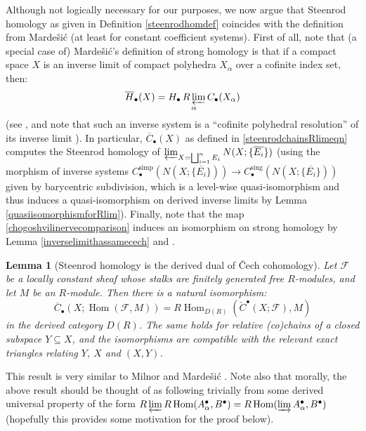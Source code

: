 \documentclass[12pt]{article}
\newtheorem{lemma}[theorem]{Lemma}
\theoremstyle{definition}
\theoremstyle{remark}
\numberwithin{equation}{subsection}
\newcommand{\F}{\mathcal F}
\newcommand{\sC}{\overline C}
\newcommand{\sH}{\overline H}
\newcommand{\cC}{\check C}
\newcommand{\Hom}{\operatorname{Hom}}
\newcommand{\Rlim}{\mathop{R\varprojlim}}
\begin{document}
Although not logically necessary for our purposes, we now argue that Steenrod homology as given in Definition \ref{steenrodhomdef} coincides with the definition from Marde\v si\'c \cite{mardesic} (at least for constant coefficient systems).  First of all, note that (a special case of) Marde\v si\'c's definition of strong homology is that if a compact space $X$ is an inverse limit of compact polyhedra $X_\alpha$ over a cofinite index set, then:
\begin{equation}
\sH_\bullet(X)=H_\bullet\Rlim_\alpha C_\bullet(X_\alpha)
\end{equation}
(see \cite[p379, \S19.1]{mardesic}, and note that such an inverse system is a ``cofinite polyhedral resolution'' of its inverse limit \cite[p103, \S6]{mardesic}).  In particular, $\sC_\bullet(X)$ as defined in \eqref{steenrodchainsRlimeqn} computes the Steenrod homology of $\varprojlim_{X=\bigsqcup_{i=1}^nE_i}N(X;\{\overline{E_i}\})$ (using the morphism of inverse systems $C_\bullet^\mathrm{simp}(N(X;\{\overline{E_i}\}))\to C_\bullet^\mathrm{sing}(N(X;\{\overline{E_i}\}))$ given by barycentric subdivision, which is a level-wise quasi-isomorphism and thus induces a quasi-isomorphism on derived inverse limits by Lemma \ref{quasiisomorphismforRlim}).  Finally, note that the map \eqref{chogoshvilinervecomparison} induces an isomorphism on strong homology by Lemma \ref{inverselimithassamecech} and \cite[p446, Theorem 21.15]{mardesic}.

\begin{lemma}[Steenrod homology is the derived dual of \v Cech cohomology]\label{steenrodisderiveddualofcech}
Let $\F$ be a locally constant sheaf whose stalks are finitely generated free $R$-modules, and let $M$ be an $R$-module.  Then there is a natural isomorphism:
\begin{equation}\label{strongcechdualiso}
\sC_\bullet(X;\Hom(\F,M))=R\Hom_{D(R)}(\cC^\bullet(X;\F),M)
\end{equation}
in the derived category $D(R)$.  The same holds for relative (co)chains of a closed subspace $Y\subseteq X$, and the isomorphisms are compatible with the relevant exact triangles relating $Y$, $X$ and $(X,Y)$.
\end{lemma}

This result is very similar to Milnor \cite[p92, Definition, Lemma 5]{milnor} and Marde\v si\'c \cite[p446, Theorem 21.15]{mardesic}.  Note also that morally, the above result should be thought of as following trivially from some derived universal property of the form $\Rlim R\Hom(A_\alpha^\bullet,B^\bullet)=R\Hom(\varinjlim A_\alpha^\bullet,B^\bullet)$ (hopefully this provides some motivation for the proof below).
\end{document}
